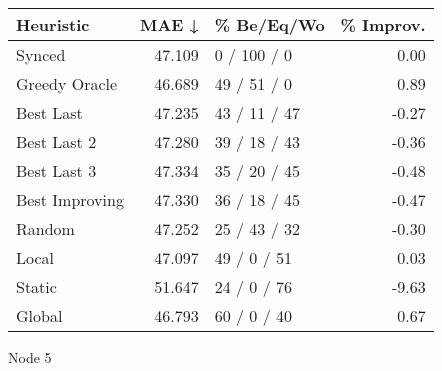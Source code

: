 \begin{tabular}{lrlr}
\toprule
\textbf{Heuristic} & \textbf{MAE ↓} & \textbf{\% Be/Eq/Wo} & \textbf{\% Improv.} \\
\midrule
            Synced &         47.109 &          0 / 100 / 0 &                0.00 \\
     Greedy Oracle &         46.689 &          49 / 51 / 0 &                0.89 \\
         Best Last &         47.235 &         43 / 11 / 47 &               -0.27 \\
       Best Last 2 &         47.280 &         39 / 18 / 43 &               -0.36 \\
       Best Last 3 &         47.334 &         35 / 20 / 45 &               -0.48 \\
    Best Improving &         47.330 &         36 / 18 / 45 &               -0.47 \\
            Random &         47.252 &         25 / 43 / 32 &               -0.30 \\
             Local &         47.097 &          49 / 0 / 51 &                0.03 \\
            Static &         51.647 &          24 / 0 / 76 &               -9.63 \\
            Global &         46.793 &          60 / 0 / 40 &                0.67 \\
\bottomrule
\end{tabular}
\caption{Node 5}
\label{tab:iid_lr05_le1_bs4_5}

